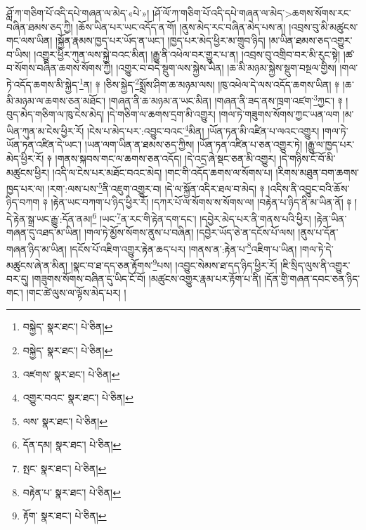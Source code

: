 ཤློ་ཀ་གཅིག་པོ་འདི་དཔེ་གཞན་ལ་མེད་«པེ་»། །ཤོ་ལོ་ཀ་གཅིག་པོ་འདི་དཔེ་གཞན་ལ་མེད་>ཆགས་སོགས་རང་བཞིན་ཐམས་ཅད་ཀྱི། །ཆོས་ཡིན་པར་ཡང་འདོད་ན་གོ། །ནུས་མེད་རང་བཞིན་མེད་པས་ན། །འབྲས་བུ་མི་མཚུངས་གང་ལས་ཡིན། །སྐྱོན་རྣམས་ཁྱད་པར་ཡོད་ན་ཡང་། །ཁྱད་པར་མེད་ཕྱིར་མ་གྲུབ་ཉིད། །མ་ཡིན་ཐམས་ཅད་འགྱུར་བ་ཡིས། །འགྱུར་ཕྱིར་ཀུན་ལས་སྐྱེ་བའང་མིན། །རྒྱུ་ནི་འཕེལ་བར་གྱུར་པ་ན། །འབྲས་བུ་འགྲིབ་བར་མི་རུང་སྟེ། །ཚ་བ་སོགས་བཞིན་ཆགས་སོགས་ཀྱི། །འགྱུར་བ་བདེ་སྡུག་ལས་སྐྱེས་ཡིན། །ཆ་མི་མཉམ་སྐྱེས་སྡུག་བསྔལ་གྱིས། །གལ་ཏེ་འདོད་ཆགས་མི་སྐྱེད་\footnote{བསྐྱེད་  སྣར་ཐང་།  པེ་ཅིན། }ན། ༈ །ཅིས་སྐྱེད་\footnote{བསྐྱེད་  སྣར་ཐང་།  པེ་ཅིན། }སྨྲོས་ཤིག་ཆ་མཉམ་ལས། །ཁུ་འཕེལ་དེ་ལས་འདོད་ཆགས་ཡིན། ༈ །ཆ་མི་མཉམ་ལ་ཆགས་ཅན་མཐོང་། །གཞན་ནི་ཆ་མཉམ་ན་ཡང་མིན། །གཞན་ནི་ཟད་ནས་ཁྲག་འཛག་\footnote{འཛགས་  སྣར་ཐང་།  པེ་ཅིན། }ཀྱང་། ༈ །བུད་མེད་གཅིག་ལ་ཁུ་ངེས་མེད། །དེ་གཅིག་ལ་ཆགས་དྲག་མི་འགྱུར། །གལ་ཏེ་གཟུགས་སོགས་ཀྱང་ཡན་ལག །མ་ཡིན་ཀུན་མ་ངེས་ཕྱིར་རོ། །ངེས་པ་མེད་པར་:འབྱུང་བའང་\footnote{འགྱུར་བའང་  སྣར་ཐང་།  པེ་ཅིན། }མིན། །ཡོན་ཏན་མི་འཛིན་པ་ལའང་འགྱུར། །གལ་ཏེ་ཡོན་ཏན་འཛིན་དེ་ཡང་། །ཡན་ལག་ཡིན་ན་ཐམས་ཅད་ཀྱིས། །ཡོན་ཏན་འཛིན་པ་ཅན་འགྱུར་ཏེ། །རྒྱུ་ལ་ཁྱད་པར་མེད་ཕྱིར་རོ། ༈ །གནས་སྐབས་གང་ལ་ཆགས་ཅན་འདོད། །དེ་འདྲ་ཞེ་སྡང་ཅན་མི་འགྱུར། །དེ་གཉིས་ངོ་བོ་མི་མཚུངས་ཕྱིར། །འདི་ལ་ངེས་པར་མཐོང་བའང་མེད། །གང་གི་འདོད་ཆགས་ལ་སོགས་པ། །རིགས་མཐུན་བག་ཆགས་ཁྱད་པར་ལ། །རག་:ལས་པས་\footnote{ལས་  སྣར་ཐང་།  པེ་ཅིན། }ནི་འཇུག་འགྱུར་བ། །དེ་ལ་སྐྱོན་འདིར་ཐལ་བ་མེད། ༈ །འདིས་ནི་འབྱུང་བའི་ཆོས་ཉིད་བཀག ༈ །རྟེན་ཡང་བཀག་པ་ཉིད་ཕྱིར་རོ། །དཀར་པོ་ལ་སོགས་ས་སོགས་ལ། །བརྟེན་པ་ཉིད་ནི་མ་ཡིན་ནོ། ༈ །དེ་རྟེན་སྒྲ་ཡང་རྒྱུ་:དོན་ནམ།\footnote{དོན་དམ།  སྣར་ཐང་།  པེ་ཅིན། } །ཡང་\footnote{སྤང་  སྣར་ཐང་།  པེ་ཅིན། }ན་རང་གི་རྟེན་དག་དང་། །དབྱེར་མེད་པར་ནི་གནས་པའི་ཕྱིར། །རྟེན་ཡིན་གཞན་དུ་འཐད་མ་ཡིན། །གལ་ཏེ་མྱོས་སོགས་ནུས་པ་བཞིན། །དབྱེར་ཡོད་ཅེ་ན་དངོས་པོ་ལས། །ནུས་པ་དོན་གཞན་ཉིད་མ་ཡིན། །དངོས་པོ་འཇིག་འགྱུར་རྟེན་ཆད་པར། །གནས་ན་:རྟེན་པ་\footnote{བརྟེན་པ་  སྣར་ཐང་།  པེ་ཅིན། }འཇིག་པ་ཡིན། །གལ་ཏེ་དེ་མཚུངས་ཞེ་ན་མིན། །སྣང་བ་ཐ་དད་ཅན་རྟོགས་\footnote{རྟོག་  སྣར་ཐང་།  པེ་ཅིན། }པས། །འབྱུང་སེམས་ཐ་དད་ཉིད་ཕྱིར་རོ། །ཇི་སྲིད་ལུས་ནི་འགྱུར་བར་དུ། །གཟུགས་སོགས་བཞིན་དུ་ཡིད་ངོ་བོ། །མཚུངས་འགྱུར་རྣམ་པར་རྟོག་པ་ནི། །དོན་གྱི་གཞན་དབང་ཅན་ཉིད་གང་། །གང་ཚེ་ལུས་ལ་ལྟོས་མེད་པར། །
